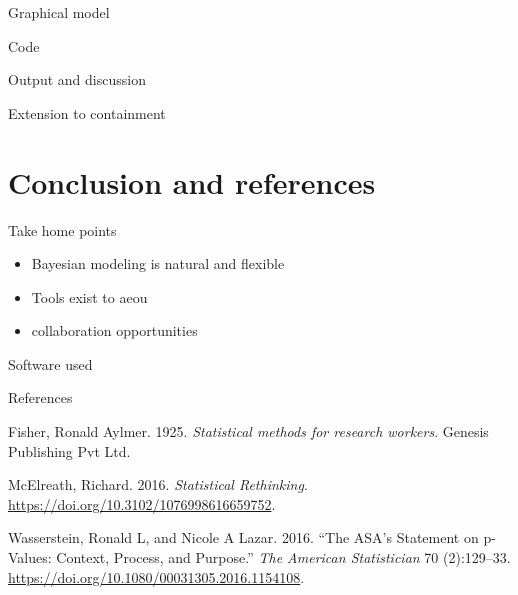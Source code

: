 \documentclass[ignorenonframetext,]{beamer}
\providecommand{\tightlist}{%
  \setlength{\itemsep}{0pt}\setlength{\parskip}{0pt}}
\begin{document}
\begin{frame}{%
\protect\hypertarget{graphical-model-1}{%
Graphical model}}

\end{frame}

\begin{frame}{%
\protect\hypertarget{code-1}{%
Code}}

\end{frame}

\begin{frame}{%
\protect\hypertarget{output-and-discussion-1}{%
Output and discussion}}

\end{frame}

\begin{frame}{%
\protect\hypertarget{extension-to-containment}{%
Extension to containment}}

\end{frame}

\hypertarget{conclusion-and-references}{%
\section{Conclusion and references}\label{conclusion-and-references}}

\begin{frame}{%
\protect\hypertarget{take-home-points}{%
Take home points}}

\begin{itemize}
\tightlist
\item
  Bayesian modeling is natural and flexible
\item
  Tools exist to aeou
\item
  collaboration opportunities
\end{itemize}

\end{frame}

\begin{frame}{%
\protect\hypertarget{software-used}{%
Software used}}

\end{frame}

\begin{frame}{%
\protect\hypertarget{references}{%
References}}

\hypertarget{refs}{}
\leavevmode\hypertarget{ref-Fisher1925}{}%
Fisher, Ronald Aylmer. 1925. \emph{Statistical methods for research
workers}. Genesis Publishing Pvt Ltd.

\leavevmode\hypertarget{ref-McElreath2016}{}%
McElreath, Richard. 2016. \emph{Statistical Rethinking}.
\url{https://doi.org/10.3102/1076998616659752}.

\leavevmode\hypertarget{ref-Wasserstein2016}{}%
Wasserstein, Ronald L, and Nicole A Lazar. 2016. “The ASA’s Statement on
p-Values: Context, Process, and Purpose.” \emph{The American
Statistician} 70 (2):129–33.
\url{https://doi.org/10.1080/00031305.2016.1154108}.

\end{frame}
\end{document}
